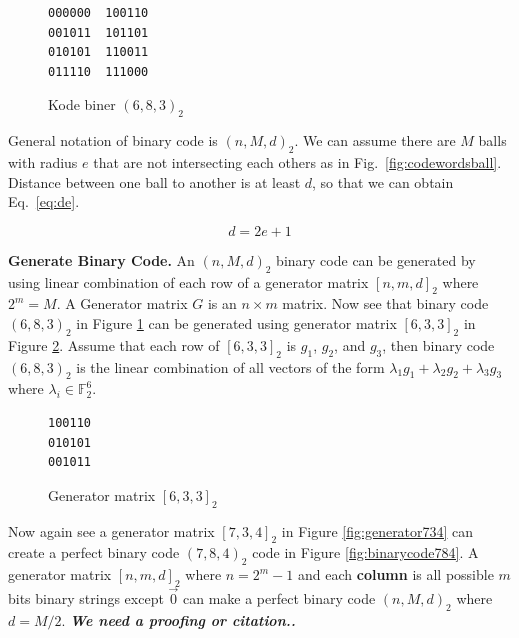 \documentclass{TTP_DSL2006}
\renewcommand{\vec}{\overrightarrow}
\begin{document}
\begin{figure}
\centering
\begin{BVerbatim}
000000  100110
001011  101101
010101  110011
011110  111000
\end{BVerbatim}
\caption{Kode biner $(6,8,3)_2$}
\label{fig:binarycode683}
\end{figure}


General notation of binary code is $(n,M,d)_2$. We can assume there are $M$ balls with radius $e$ that are not intersecting each others as in Fig.~\ref{fig:codewordsball}. Distance between one ball to another is at least $d$, so that we can obtain Eq.~\ref{eq:de}.

\begin{equation} \label{eq:de}
d = 2e + 1
\end{equation}


\noindent \textbf{Generate Binary Code.}
An $(n,M,d)_2$ binary code can be generated by using linear combination of each row of a generator matrix $[n,m,d]_2$ where $2^m = M$. A Generator matrix $G$ is an $n \times m$ matrix. Now see that binary code $(6,8,3)_2$ in Figure \ref{fig:binarycode683} can be generated using generator matrix $[6,3,3]_2$ in Figure \ref{fig:generator633}. Assume that each row of $[6,3,3]_2$ is $g_1$, $g_2$, and $g_3$, then binary code $(6,8,3)_2$ is the linear combination of all vectors of the form ${\lambda}_1 g_1 + {\lambda}_2 g_2 + {\lambda}_3 g_3$ where $\lambda{_i} \in \mathbb{F}_2^6$.

\begin{figure}
\centering
\begin{BVerbatim}
100110
010101
001011
\end{BVerbatim}
\caption{Generator matrix $[6,3,3]_2$}
\label{fig:generator633}
\end{figure}

Now again see a generator matrix $[7,3,4]_2$ in Figure \ref{fig:generator734} can create a perfect binary code $(7,8,4)_2$ code in Figure \ref{fig:binarycode784}. A generator matrix $[n, m, d]_2$ where $n = 2^m - 1$ and each \textbf{column} is all possible $m$ bits binary strings except $\vec{0}$ can make a perfect binary code $(n,M,d)_2$ where $d = M/2$.
\textbf{\textit{We need a proofing or citation..}}
\end{document}

